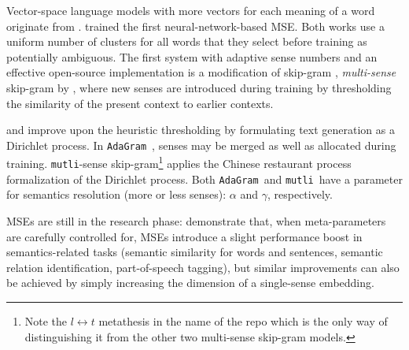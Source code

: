 \documentclass[11pt]{article}
\newcommand{\adagram}{\texttt{AdaGram}}
\newcommand{\mutli}{\texttt{mutli}}
\begin{document}
\label{sec:mse}

Vector-space language models with more vectors for each meaning of a
word originate from \cite{Reisinger:2010}.
\cite{Huang:2012} trained the first neural-network-based MSE.
Both works use a uniform number of clusters for all words that they select
before training as potentially ambiguous.
The first system with adaptive sense numbers and an effective open-source
implementation is a modification of skip-gram \cite{Mikolov:2013d},
\emph{multi-sense} skip-gram by \cite{Neelakantan:2014}, where new senses are
introduced during training by thresholding the similarity of the present
context to earlier contexts.



\cite{Bartunov:2015} and \cite{Li:2015} improve upon the heuristic thresholding
by formulating text generation as a Dirichlet process. In
\adagram~\citep{Bartunov:2015}, senses may be merged as well as allocated
during training. \mutli-sense skip-gram\footnote{Note the $l\leftrightarrow
t$ metathesis in the name of the repo which is the only way of distinguishing it
from the other two multi-sense skip-gram models.} \citep{Li:2015} applies the
Chinese restaurant process formalization of the Dirichlet process. Both
\adagram~and \mutli~have a parameter for semantics resolution (more or less
senses): $\alpha$ and $\gamma$, respectively.


MSEs are still in the research phase: \cite{Li:2015}  demonstrate that, when
meta-parameters are carefully controlled for, MSEs introduce a slight
performance boost in semantics-related tasks (semantic similarity for words and
sentences, semantic relation identification, part-of-speech tagging), but
similar improvements can also be achieved by simply increasing the dimension of
a single-sense embedding.
\end{document}
